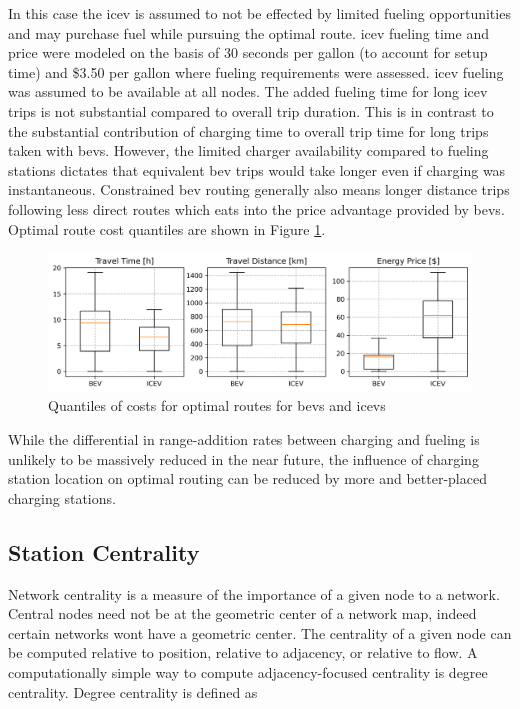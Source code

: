 \documentclass[12pt]{article}
\begin{document}
In this case the \gls{icev} is assumed to not be effected by limited fueling opportunities and may purchase fuel while pursuing the optimal route. \gls{icev} fueling time and price were modeled on the basis of 30 seconds per gallon (to account for setup time) and \$3.50 per gallon where fueling requirements were assessed. \gls{icev} fueling was assumed to be available at all nodes. The added fueling time for long \gls{icev} trips is not substantial compared to overall trip duration. This is in contrast to the substantial contribution of charging time to overall trip time for long trips taken with \glspl{bev}. However, the limited charger availability compared to fueling stations dictates that equivalent \gls{bev} trips would take longer even if charging was instantaneous. Constrained \gls{bev} routing generally also means longer distance trips following less direct routes which eats into the price advantage provided by \glspl{bev}. Optimal route cost quantiles are shown in Figure \ref{fig:routes_boxplots}.

\begin{figure}[H]
	\centering
	\includegraphics[width = \linewidth]{figs/routes_boxplots.png}
	\caption{Quantiles of costs for optimal routes for \glspl{bev} and \glspl{icev}}
	\label{fig:routes_boxplots}
\end{figure}

While the differential in range-addition rates between charging and fueling is unlikely to be massively reduced in the near future, the influence of charging station location on optimal routing can be reduced by more and better-placed charging stations.

\subsection*{Station Centrality}

Network centrality is a measure of the importance of a given node to a network. Central nodes need not be at the geometric center of a network map, indeed certain networks wont have a geometric center. The centrality of a given node can be computed relative to position, relative to adjacency, or relative to flow. A computationally simple way to compute adjacency-focused centrality is degree centrality. Degree centrality is defined as
\end{document}
